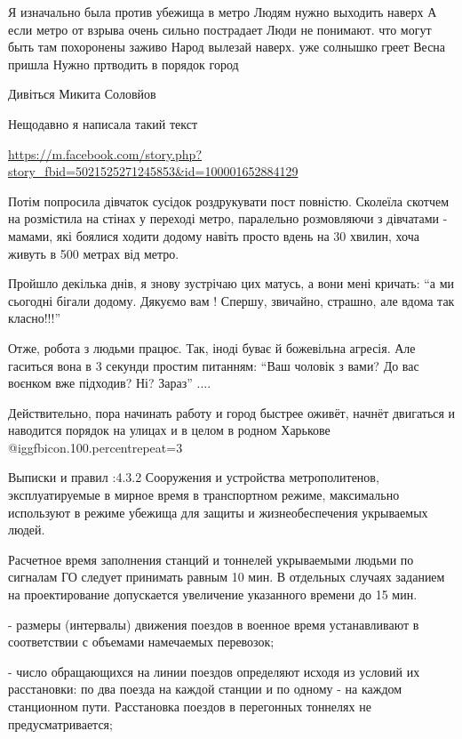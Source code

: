 \begin{itemize}

Я изначально была против убежища в метро Людям нужно выходить наверх А если
метро от взрыва очень сильно пострадает Люди не понимают. что могут быть там
похоронены заживо Народ вылезай наверх. уже солнышко греет Весна пришла Нужно
пртводить в порядок город


Дивіться Микита Соловйов

Нещодавно я написала такий текст

\url{https://m.facebook.com/story.php?story_fbid=5021525271245853&id=100001652884129}

Потім попросила дівчаток сусідок роздрукувати пост повністю. Сколеїла скотчем
на розмістила на стінах у переході метро, паралельно розмовляючи з дівчатами -
мамами, які боялися ходити додому навіть просто вдень на 30 хвилин, хоча живуть
в 500 метрах від метро.

Пройшло декілька днів, я знову зустрічаю цих матусь, а вони мені кричать:
\enquote{а ми сьогодні бігали додому. Дякуємо вам ! Спершу, звичайно, страшно,
але вдома так класно!!!}

Отже, робота з людьми працює. Так, іноді буває й божевільна агресія. Але
гаситься вона в 3 секунди простим питанням: \enquote{Ваш чоловік з вами? До вас
воєнком вже підходив? Ні? Зараз} ....


Действительно, пора начинать работу и город быстрее оживёт, начнёт двигаться и
наводится порядок на улицах и в целом в родном Харькове  @igg{fbicon.100.percent}{repeat=3} 


Выписки и правил :4.3.2 Сооружения и устройства метрополитенов, эксплуатируемые
в мирное время в транспортном режиме, максимально используют в режиме убежища
для защиты и жизнеобеспечения укрываемых людей.

Расчетное время заполнения станций и тоннелей укрываемыми людьми по сигналам ГО
следует принимать равным 10 мин. В отдельных случаях заданием на проектирование
допускается увеличение указанного времени до 15 мин.

- размеры (интервалы) движения поездов в военное время устанавливают в
соответствии с объемами намечаемых перевозок;

- число обращающихся на линии поездов определяют исходя из условий их
расстановки: по два поезда на каждой станции и по одному - на каждом
станционном пути. Расстановка поездов в перегонных тоннелях не
предусматривается;


\end{itemize}

